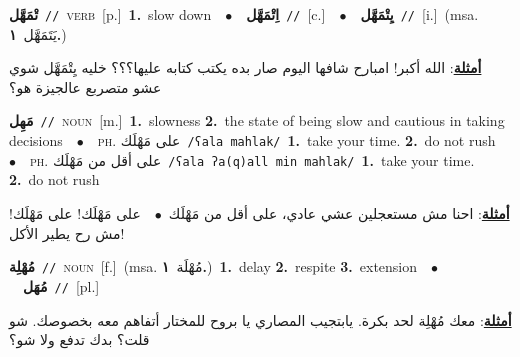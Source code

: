 \documentclass[10pt,a4paper,twoside]{article} %
\begin{document}
\begin{multicols}{2}
{\setlength\topsep{0pt}\textbf{\foreignlanguage{arabic}{تْمَهَّل}}\ {\color{gray}\texttt{//}\color{black}}\ \textsc{verb}\ [p.]\ \textbf{1.}~slow down\ \ $\bullet$\ \ \setlength\topsep{0pt}\textbf{\foreignlanguage{arabic}{اِتْمَهَّل}}\ {\color{gray}\texttt{//}\color{black}}\ [c.]\ \ $\bullet$\ \ \setlength\topsep{0pt}\textbf{\foreignlanguage{arabic}{يِتْمَهَّل}}\ {\color{gray}\texttt{//}\color{black}}\ [i.]\ \color{gray}(msa. \foreignlanguage{arabic}{يَتَمَهَّل}~\foreignlanguage{arabic}{\textbf{١.}})\color{black}\  \begin{flushright}\color{gray}\foreignlanguage{arabic}{\textbf{\underline{\foreignlanguage{arabic}{أمثلة}}}: الله أكبر! امبارح شافها اليوم صار بده يكتب كتابه عليها؟؟؟ خليه يِتْمَهَّل شوي عشو متصربع عالجيزة هو؟}\end{flushright}\color{black}} \vspace{2mm}

{\setlength\topsep{0pt}\textbf{\foreignlanguage{arabic}{مَهِل}}\ {\color{gray}\texttt{//}\color{black}}\ \textsc{noun}\ [m.]\ \textbf{1.}~slowness  \textbf{2.}~the state of being slow and cautious in taking decisions\ \ $\bullet$\ \ \textsc{ph.} \color{gray} \foreignlanguage{arabic}{على مَهْلَك}\color{black}\ {\color{gray}\texttt{/{\sffamily ʕala mahlak}/}\color{black}}\ \textbf{1.}~take your time.  \textbf{2.}~do not rush\ \ $\bullet$\ \ \textsc{ph.} \color{gray} \foreignlanguage{arabic}{على أقل من مَهْلَك}\color{black}\ {\color{gray}\texttt{/{\sffamily ʕala ʔa(q)all min mahlak}/}\color{black}}\ \textbf{1.}~take your time.  \textbf{2.}~do not rush\  \begin{flushright}\color{gray}\foreignlanguage{arabic}{\textbf{\underline{\foreignlanguage{arabic}{أمثلة}}}: احنا مش مستعجلين عشي عادي، على أقل من مَهْلَك\ $\bullet$\ \  على مَهْلَك! على مَهْلَك! مش رح يطير الأكل!}\end{flushright}\color{black}} \vspace{2mm}

{\setlength\topsep{0pt}\textbf{\foreignlanguage{arabic}{مُهْلِة}}\ {\color{gray}\texttt{//}\color{black}}\ \textsc{noun}\ [f.]\ \color{gray}(msa. \foreignlanguage{arabic}{مُهْلَة}~\foreignlanguage{arabic}{\textbf{١.}})\color{black}\ \textbf{1.}~delay  \textbf{2.}~respite  \textbf{3.}~extension\ \ $\bullet$\ \ \setlength\topsep{0pt}\textbf{\foreignlanguage{arabic}{مُهَل}}\ {\color{gray}\texttt{//}\color{black}}\ [pl.]\  \begin{flushright}\color{gray}\foreignlanguage{arabic}{\textbf{\underline{\foreignlanguage{arabic}{أمثلة}}}: معك مُهْلِة لحد بكرة. يابتجيب المصاري يا بروح للمختار أتفاهم معه بخصوصك. شو قلت؟ بدك تدفع ولا شو؟}\end{flushright}\color{black}} \vspace{2mm}


\end{multicols}
\end{document}
